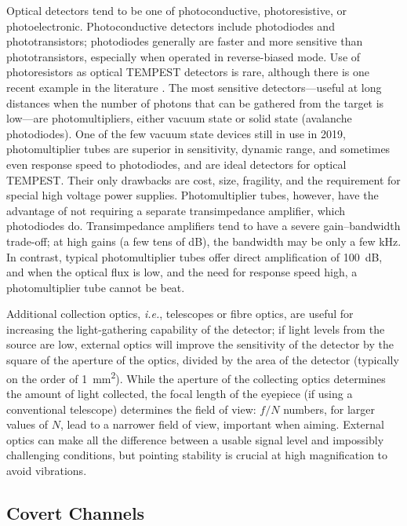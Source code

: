 \documentclass[a4paper,twoside,11pt,openany]{book}
\begin{document}
Optical detectors tend to be one of photoconductive, photoresistive, or
photoelectronic. Photoconductive detectors include photodiodes and
phototransistors; photodiodes generally are faster and more sensitive than
phototransistors, especially when operated in reverse-biased mode. Use of
photoresistors as optical TEMPEST detectors is rare, although there is one
recent example in the literature \cite{Barisani2009a}. The most sensitive
detectors---useful at long distances when the number of photons that can be
gathered from the target is low---are photomultipliers, either vacuum state or
solid state (avalanche photodiodes). One of the few vacuum state devices still
in use in 2019, photomultiplier tubes are superior in sensitivity, dynamic
range, and sometimes even response speed to photodiodes, and are ideal
detectors for optical TEMPEST. Their only drawbacks are cost, size, fragility,
and the requirement for special high voltage power supplies. Photomultiplier
tubes, however, have the advantage of not requiring a separate transimpedance
amplifier, which photodiodes do. Transimpedance amplifiers tend to have a severe
gain--bandwidth trade-off; at high gains (a few tens of \si{\deci\bel}), the
bandwidth may be only a few \si{\kilo\hertz}. In contrast, typical
photomultiplier tubes offer direct amplification of \SI{100}{\deci\bel}, and
when the optical flux is low, and the need for response speed high, a
photomultiplier tube cannot be beat.

Additional collection optics, {\it i.e.}, telescopes or fibre optics, are
useful for increasing the light-gathering capability of the detector; if light
levels from the source are low, external optics will improve the sensitivity of
the detector by the square of the aperture of the optics, divided by the area
of the detector (typically on the order of \SI{1}{\square\milli\metre}). While
the aperture of the collecting optics determines the amount of light collected,
the focal length of the eyepiece (if using a conventional telescope) determines
the field of view: $f/N$ numbers, for larger values of $N$, lead to a narrower
field of view, important when aiming. External optics can make all the
difference between a usable signal level and impossibly challenging conditions,
but pointing stability is crucial at high magnification to avoid vibrations.

\subsection{Covert Channels}
\label{section:injection_attacks}
\end{document}
